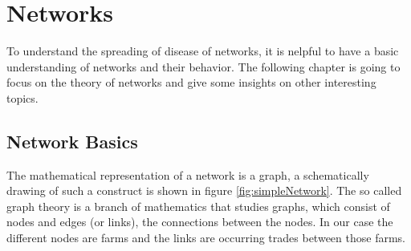 \section{Networks}\label{chap:networksBasics}
To understand the spreading of disease of networks, it is nelpful to have a basic understanding of networks and their behavior. The following chapter is going to focus on the theory of networks and give some insights on other interesting topics.
\subsection{Network Basics}
The mathematical representation of a network is a graph, a schematically drawing of such a construct is shown in figure \ref{fig:simpleNetwork}. The so called graph theory is a branch of mathematics that studies graphs, which consist of nodes and edges (or links), the connections between the nodes. In our case the different nodes are farms and the links are occurring trades between those farms.
